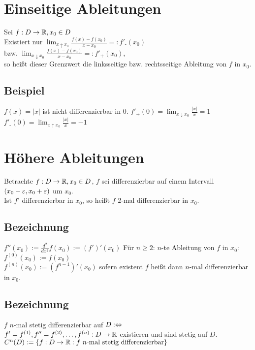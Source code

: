 \section*{Einseitige Ableitungen}
Sei $f: D \to \mathbb{R}, x_0 \in D$\\
Existiert nur $\lim_{x \uparrow x_0} \frac{f(x)-f(x_0)}{x-x_0} =: f'_{\text{-}}(x_0)$\\
bzw. $\lim_{x \downarrow x_0} \frac{f(x)-f(x_0)}{x-x_0} =: f'_{\text{+}}(x_0)$,\\
so heißt dieser Grenzwert die linksseitige bzw. rechtsseitige Ableitung von $f$ in $x_0$.

\subsection*{Beispiel}
$f(x)=|x|$ ist nicht differenzierbar in $0$.\nl
$f'_{\text{+}}(0) = \lim_{x \downarrow x_0} \frac{|x|}{x} = 1$\\
$f'_{\text{-}}(0) = \lim_{x \uparrow x_0} \frac{|x|}{x} = -1$\nl
{}

\newpage

{}
\section*{Höhere Ableitungen}
Betrachte $f: D \to \mathbb{R}, x_0 \in D$, $f$ sei differenzierbar auf einem Intervall $(x_0-\varepsilon, x_0+\varepsilon)$ um $x_0$.\\
Ist $f'$ differenzierbar in $x_0$, so heißt $f$ 2-mal differenzierbar in $x_0$.

\subsection*{Bezeichnung}
$f''(x_0) := \frac{d^2}{dx^2} f(x_0) := (f')'(x_0)$\nl
Für $n \ge 2$: $n$-te Ableitung von $f$ in $x_0$:\\
$f^{(0)}(x_0) := f(x_0)$\\
$f^{(n)}(x_0) := (f^{n-1})'(x_0)$ sofern existent\nl
$f$ heißt dann $n$-mal differenzierbar in $x_0$.

\subsection*{Bezeichnung}
$f$ $n$-mal stetig differenzierbar auf $D :\Leftrightarrow$\\
$f'=f^{(1)}, f''=f^{(2)}, \ldots, f^{(n)}: D \to \mathbb{R}$ existieren und sind stetig auf $D$.\nl
$C^n(D) := \{f: D \to \mathbb{R}: f \ n\text{-mal stetig differenzierbar}\}$

